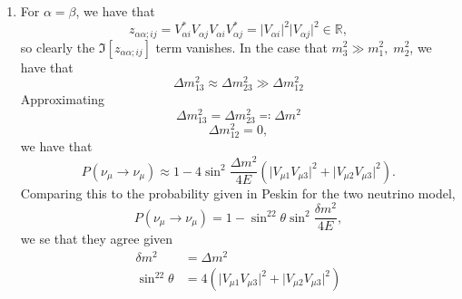 \documentclass[12pt]{article}
\newcommand{\magsq}[1]{\big|#1\big|^2}
\begin{document}
\begin{enumerate}[label=(\alph*)]
    \item For $\alpha = \beta$, we have that
    \[ z_{\alpha\alpha;ij} = V_{\alpha i}^*V_{\alpha j}V_{\alpha i}V_{\alpha j}^* = \magsq{V_{\alpha i}}\magsq{V_{\alpha j}} \in \mathbb{R}, \]
    so clearly the $\Im[z_{\alpha\alpha;ij}]$ term vanishes. In the case that $m_3^2 \gg m_1^2,\;m_2^2$, we have that 
    \[ \Delta m_{13}^2 \approx \Delta m_{23}^2 \gg \Delta m_{12}^2 \]
    Approximating
    \[ \Delta m_{13}^2 = \Delta m_{23}^2 \eqqcolon \Delta m^2 \]
    \[ \Delta m_{12}^2 = 0, \]
    we have that
    \[ P(\nu_\mu \to \nu_\mu) \approx 1 - 4\sin^2\frac{\Delta m^2}{4E}\left(\magsq{V_{\mu 1}V_{\mu 3}} + \magsq{V_{\mu 2}V_{\mu 3}}\right). \]
    Comparing this to the probability given in Peskin for the two neutrino model,
    \[ P(\nu_\mu \to \nu_\mu) = 1 - \sin^22\theta\sin^2\frac{\delta m^2}{4E}, \]
    we se that they agree given
    \begin{align*}
        \delta m^2 &= \Delta m^2 \\
        \sin^22\theta &= 4\left(\magsq{V_{\mu 1}V_{\mu 3}} + \magsq{V_{\mu 2}V_{\mu 3}}\right)
    \end{align*}
\end{enumerate}
\end{document}
